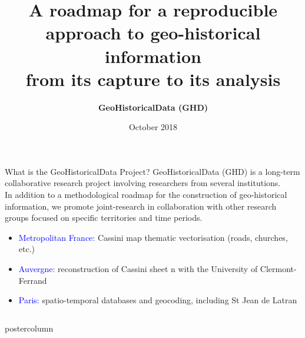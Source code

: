 \documentclass[final,hyperref={pdfpagelabels=false}]{beamer}
\title{A roadmap for a reproducible approach to geo-historical information\\from its capture to its analysis}
\author{\Large \textbf{GeoHistoricalData (GHD)}}
\institute{~}
\date{October 2018}
\let\oldcite=\cite
\renewcommand{\cite}[1]{\textcolor{ta3chameleon}{\oldcite{#1}}}
\begin{document}
\begin{frame}
  \begin{block}{What is the GeoHistoricalData Project?}
    \textcolor{ta3orange}{GeoHistoricalData} (GHD) is a long-term collaborative research project involving researchers from several institutions.\\%
    In addition to a methodological roadmap for the construction of geo-historical information, we promote joint-research in collaboration with other research groups focused on specific territories and time periods.%
    \begin{itemize}
    \item \textcolor{blue}{Metropolitan France:} \textcolor{ta3orange}{Cassini} map thematic vectorisation (roads, churches, etc.)
    \item \textcolor{blue}{Auvergne:} \textcolor{ta3orange}{reconstruction of Cassini sheet n} with the University of Clermont-Ferrand
    \item \textcolor{blue}{Paris:} spatio-temporal databases and geocoding, including \textcolor{ta3orange}{St Jean de Latran}~\cite{Rebolledo-Dhuin2014}
    \end{itemize}
  \end{block}
  \begin{columns}
    \begin{column}{0.5\textwidth}
    \begin{beamercolorbox}[center,wd=\textwidth]{postercolumn}

\end{beamercolorbox}
\end{column}
\end{columns}
\end{frame}
\end{document}
